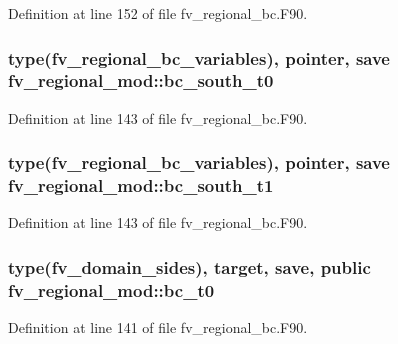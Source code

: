 Definition at line 152 of file fv\-\_\-regional\-\_\-bc.\-F90.

\subsubsection[{bc\-\_\-south\-\_\-t0}]{\setlength{\rightskip}{0pt plus 5cm}type({\bf fv\-\_\-regional\-\_\-bc\-\_\-variables}), pointer, save fv\-\_\-regional\-\_\-mod\-::bc\-\_\-south\-\_\-t0\hspace{0.3cm}{\ttfamily [private]}}\label{classfv__regional__mod_a8868f1a8567b94835e8c8d4a86c245c0}


Definition at line 143 of file fv\-\_\-regional\-\_\-bc.\-F90.

\subsubsection[{bc\-\_\-south\-\_\-t1}]{\setlength{\rightskip}{0pt plus 5cm}type({\bf fv\-\_\-regional\-\_\-bc\-\_\-variables}), pointer, save fv\-\_\-regional\-\_\-mod\-::bc\-\_\-south\-\_\-t1\hspace{0.3cm}{\ttfamily [private]}}\label{classfv__regional__mod_af6125f39e9a9ed769e9cd2a17a8d3c99}


Definition at line 143 of file fv\-\_\-regional\-\_\-bc.\-F90.

\subsubsection[{bc\-\_\-t0}]{\setlength{\rightskip}{0pt plus 5cm}type({\bf fv\-\_\-domain\-\_\-sides}), target, save, public fv\-\_\-regional\-\_\-mod\-::bc\-\_\-t0}\label{classfv__regional__mod_aa378b52fed4e1ce5559f939a10e55a1c}


Definition at line 141 of file fv\-\_\-regional\-\_\-bc.\-F90.

